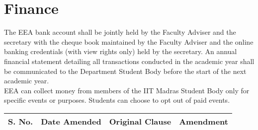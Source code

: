 \documentclass[12pt]{charter}
\begin{document}
\section{Finance}
The EEA bank account shall be jointly held by the Faculty Adviser and the secretary with the cheque book maintained by the Faculty Adviser and the online banking credentials (with view rights only) held by the secretary. An annual financial statement detailing all transactions conducted in the academic year shall be communicated to the Department Student Body before the start of the next academic year.\\
EEA can collect money from members of the IIT Madras Student Body only for specific events or purposes. Students can choose to opt out of paid events.

\pagebreak


\begin{table}[h]
	\begin{center}
		\bgroup
		\def\arraystretch{1.5}
		\begin{tabularx}{\textwidth}{|c|c|Y|Y|}
			\hline
			S. No. & Date Amended & Original Clause & Amendment\\
			\hline
		\end{tabularx}
		\egroup
	\end{center}
\end{table}
\end{document}
